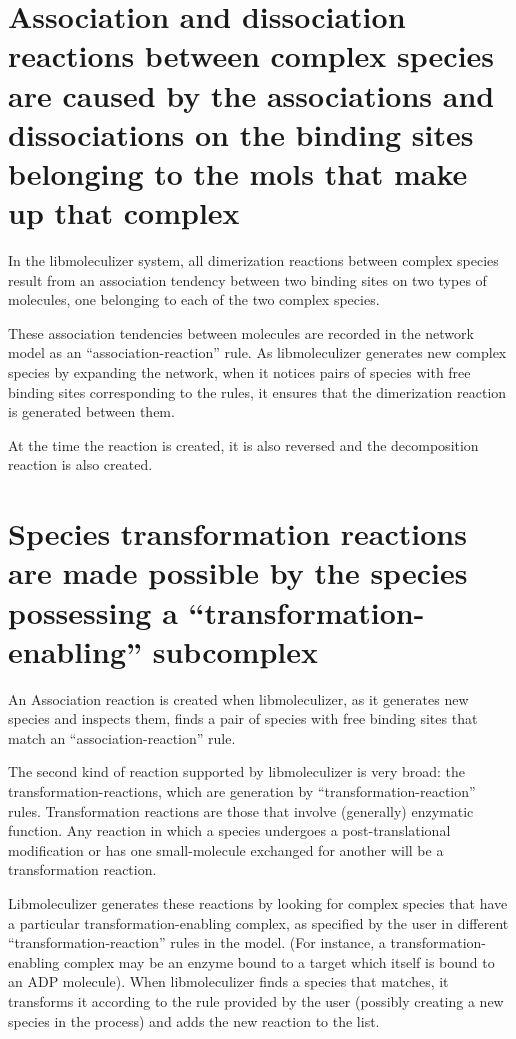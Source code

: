 \section{Association and dissociation reactions between complex
  species are caused by the associations and dissociations on the
  binding sites belonging to the mols that make up that complex}

In the libmoleculizer system, all dimerization reactions between
complex species result from an association tendency between two
binding sites on two types of molecules, one belonging to each of the
two complex species.  

These association tendencies between molecules are recorded in the
network model as an ``association-reaction'' rule.  As libmoleculizer
generates new complex species by expanding the network, when it
notices pairs of species with free binding sites corresponding to the
rules, it ensures that the dimerization reaction is generated between
them.

At the time the reaction is created, it is also reversed and the
decomposition reaction is also created.  

\section{Species transformation reactions are made possible by the
  species possessing a ``transformation-enabling'' subcomplex}
An Association reaction is created when libmoleculizer, as it
generates new species and inspects them, finds a pair of species with
free binding sites that match an ``association-reaction'' rule.  

The second kind of reaction supported by libmoleculizer is very broad:
the transformation-reactions, which are generation by
``transformation-reaction'' rules.  Transformation reactions are those
that involve (generally) enzymatic function.  Any reaction in which a
species undergoes a post-translational modification or has one
small-molecule exchanged for another will be a transformation
reaction.  

Libmoleculizer generates these reactions by looking for complex
species that have a particular transformation-enabling complex, as
specified by the user in different ``transformation-reaction'' rules
in the model. (For instance, a transformation-enabling complex may be
an enzyme bound to a target which itself is bound to an ADP
molecule).  When libmoleculizer finds a species that matches, it
transforms it according to the rule provided by the user (possibly
creating a new species in the process) and adds the new
reaction to the list.  

